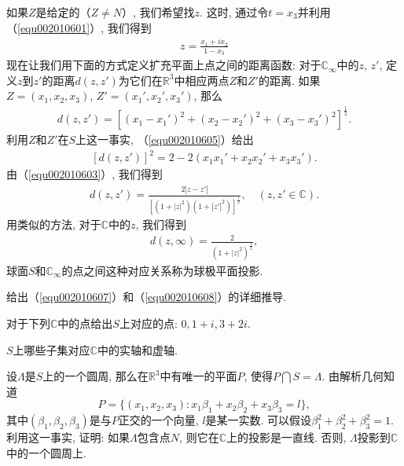 如果$Z$是给定的（$Z \neq N$）, 我们希望找$z$. 这时, 通过令$t = x_3$并利用（\ref{equ002010601}）, 我们得到
\begin{gather}\label{equ002010604}
z = \frac{x_1 + ix_2}{1 - x_3}
\end{gather}
现在让我们用下面的方式定义扩充平面上点之间的距离函数: 对于$\mathbb{C}_{\infty}$中的$z$, $z'$, 定义$z$到$z'$的距离$d(z,z')$为它们在$\mathbb{R}^3$中相应两点$Z$和$Z'$的距离. 如果$Z=(x_1,x_2,x_3)$, $Z'=(x_1',x_2',x_3')$, 那么
\begin{gather}\label{equ002010605}
d(z,z') = [(x_1-x_1')^2 + (x_2-x_2')^2 + (x_3-x_3')^2]^{\frac{1}{2}}.
\end{gather}
利用$Z$和$Z'$在$S$上这一事实, （\ref{equ002010605}）给出
\begin{gather}\label{equ002010606}
[d(z,z')]^2 = 2 - 2(x_1x_1' + x_2x_2'+x_3x_3').
\end{gather}
由（\ref{equ002010603}）, 我们得到
\begin{gather}\label{equ002010607}
d(z,z') = \frac{2|z-z'|}{[(1+|z|^2)(1+|z'|^2)]^{\frac{1}{2}}}, \quad (z,z' \in \mathbb{C}).
\end{gather}
用类似的方法, 对于$\mathbb{C}$中的$z$, 我们得到
\begin{gather}\label{equ002010608}
d(z, \infty) = \frac{2}{(1 + |z|^2)^{\frac{1}{2}}},
\end{gather}
球面$S$和$\mathbb{C}_{\infty}$的点之间这种对应关系称为球极平面投影. 

\begin{exercise}
给出（\ref{equ002010607}）和（\ref{equ002010608}）的详细推导. 
\end{exercise}

\begin{exercise}
对于下列$\mathbb{C}$中的点给出$S$上对应的点: $0, 1+i,3+2i$. 
\end{exercise}

\begin{exercise}
$S$上哪些子集对应$\mathbb{C}$中的实轴和虚轴. 
\end{exercise}

\begin{exercise}
设$\Lambda$是$S$上的一个圆周, 那么在$\mathbb{R}^3$中有唯一的平面$P$, 使得$P \bigcap S = \Lambda$. 由解析几何知道
\[
P = \{(x_1,x_2,x_3):x_1\beta_1 + x_2\beta_2 + x_3\beta_3 = l\},
\]
其中$(\beta_1,\beta_2,\beta_3)$是与$P$正交的一个向量, $l$是某一实数. 可以假设$\beta_1^2+\beta_2^2+\beta_3^2=1$. 利用这一事实, 证明: 如果$\Lambda$包含点$N$, 则它在$\mathbb{C}$上的投影是一直线. 否则, $\Lambda$投影到$\mathbb{C}$中的一个圆周上. 
\end{exercise}

